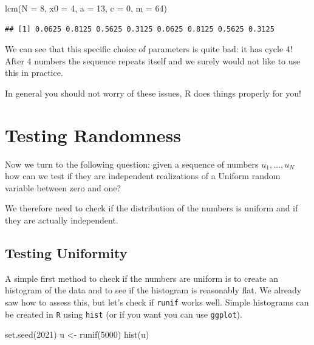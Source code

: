 \documentclass[
]{book}
\newenvironment{Shaded}{\begin{snugshade}}{\end{snugshade}}
\newcommand{\AttributeTok}[1]{\textcolor[rgb]{0.77,0.63,0.00}{#1}}
\newcommand{\DecValTok}[1]{\textcolor[rgb]{0.00,0.00,0.81}{#1}}
\newcommand{\FunctionTok}[1]{\textcolor[rgb]{0.00,0.00,0.00}{#1}}
\newcommand{\NormalTok}[1]{#1}
\newcommand{\OtherTok}[1]{\textcolor[rgb]{0.56,0.35,0.01}{#1}}
\theoremstyle{definition}
\theoremstyle{definition}
\theoremstyle{definition}
\theoremstyle{definition}
\theoremstyle{remark}
\begin{document}
\begin{Shaded}
\begin{Highlighting}[]
\FunctionTok{lcm}\NormalTok{(}\AttributeTok{N =} \DecValTok{8}\NormalTok{, }\AttributeTok{x0 =} \DecValTok{4}\NormalTok{, }\AttributeTok{a =} \DecValTok{13}\NormalTok{, }\AttributeTok{c =} \DecValTok{0}\NormalTok{, }\AttributeTok{m =} \DecValTok{64}\NormalTok{)}
\end{Highlighting}
\end{Shaded}

\begin{verbatim}
## [1] 0.0625 0.8125 0.5625 0.3125 0.0625 0.8125 0.5625 0.3125
\end{verbatim}

We can see that this specific choice of parameters is quite bad: it has cycle 4! After 4 numbers the sequence repeats itself and we surely would not like to use this in practice.

In general you should not worry of these issues, R does things properly for you!

\hypertarget{testing-randomness}{%
\section{Testing Randomness}\label{testing-randomness}}

Now we turn to the following question: given a sequence of numbers \(u_1,\dots,u_N\) how can we test if they are independent realizations of a Uniform random variable between zero and one?

We therefore need to check if the distribution of the numbers is uniform and if they are actually independent.

\hypertarget{testing-uniformity}{%
\subsection{Testing Uniformity}\label{testing-uniformity}}

A simple first method to check if the numbers are uniform is to create an histogram of the data and to see if the histogram is reasonably flat. We already saw how to assess this, but let's check if \texttt{runif} works well. Simple histograms can be created in \texttt{R} using \texttt{hist} (or if you want you can use \texttt{ggplot}).

\begin{Shaded}
\begin{Highlighting}[]
\FunctionTok{set.seed}\NormalTok{(}\DecValTok{2021}\NormalTok{)}
\NormalTok{u }\OtherTok{\textless{}{-}} \FunctionTok{runif}\NormalTok{(}\DecValTok{5000}\NormalTok{)}
\FunctionTok{hist}\NormalTok{(u)}
\end{Highlighting}
\end{Shaded}
\end{document}

